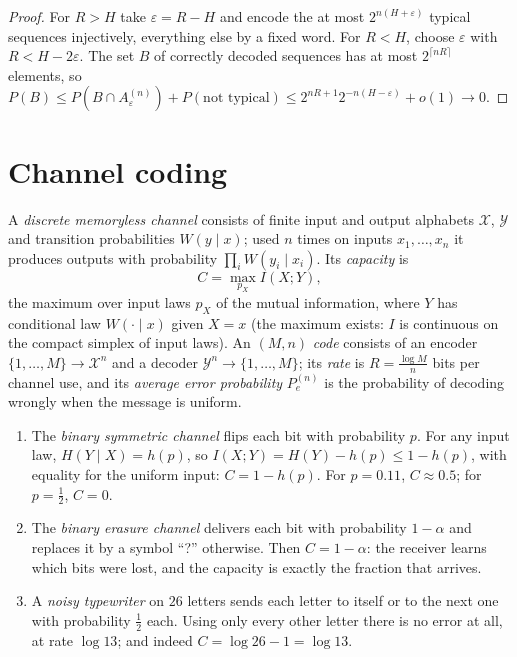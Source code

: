 \begin{proof}
For $R > H$ take $\varepsilon = R - H$ and encode the at most $2^{n(H + \varepsilon)}$ typical sequences injectively, everything else by a fixed word. For $R < H$, choose $\varepsilon$ with $R < H - 2\varepsilon$. The set $B$ of
correctly decoded sequences has at most $2^{\lceil nR\rceil}$ elements, so $P(B) \leq P(B \cap A_\varepsilon^{(n)}) + P(\text{not typical}) \leq 2^{nR + 1}2^{-n(H - \varepsilon)} + o(1) \to 0$.
\end{proof}

\section{Channel coding}\label{information-theory:section-channel-coding}

\begin{definition}\label{information-theory:definition-channel}
A \emph{discrete memoryless channel} consists of finite input and output alphabets $\mathcal{X}$, $\mathcal{Y}$ and transition probabilities $W(y \mid x)$; used $n$ times on inputs $x_1, \ldots, x_n$ it produces outputs with probability
$\prod_iW(y_i \mid x_i)$. Its \emph{capacity} is
\[
C = \max_{p_X}I(X; Y),
\]
the maximum over input laws $p_X$ of the mutual information, where $Y$ has conditional law $W(\cdot \mid x)$ given $X = x$ (the maximum exists: $I$ is continuous on the compact simplex of input laws). An $(M, n)$ \emph{code} consists of
an encoder $\{1, \ldots, M\} \to \mathcal{X}^n$ and a decoder $\mathcal{Y}^n \to \{1, \ldots, M\}$; its \emph{rate} is $R = \frac{\log M}{n}$ bits per channel use, and its \emph{average error probability} $P_e^{(n)}$ is the probability of
decoding wrongly when the message is uniform.
\end{definition}

\begin{example}\label{information-theory:example-capacity}
\begin{enumerate}
\item The \emph{binary symmetric channel} flips each bit with probability $p$. For any input law, $H(Y \mid X) = h(p)$, so $I(X; Y) = H(Y) - h(p) \leq 1 - h(p)$, with equality for the uniform input: $C = 1 - h(p)$. For $p = 0.11$,
$C \approx 0.5$; for $p = \frac12$, $C = 0$.
\item The \emph{binary erasure channel} delivers each bit with probability $1 - \alpha$ and replaces it by a symbol ``?'' otherwise. Then $C = 1 - \alpha$: the receiver learns which bits were lost, and the capacity is exactly the
fraction that arrives.
\item A \emph{noisy typewriter} on $26$ letters sends each letter to itself or to the next one with probability $\frac12$ each. Using only every other letter there is no error at all, at rate $\log 13$; and indeed
$C = \log 26 - 1 = \log 13$.
\end{enumerate}
\end{example}

